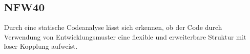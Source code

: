 \subsection*{NFW40}

Durch eine statische Codeanalyse lässt sich erkennen, ob der Code durch Verwendung von Entwicklungsmuster eine flexible und erweiterbare Struktur mit loser Kopplung aufweist.
